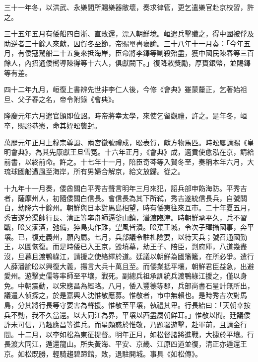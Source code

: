 \begin{pinyinscope}
三十一年冬，以洪武、永樂間所賜樂器敝壞，奏求律管，更乞遣樂官赴京校習，許之。

三十五年五月有倭船四自浙、直敗還，漂入朝鮮境。峘遣兵擊殲之，得中國被俘及助逆者三十餘人來獻，因賀冬至節，帝賜璽書褒諭。三十八年十一月奏：「今年五月，有倭寇駕船二十五隻來抵海岸，臣命將李鐸等剿殺殆盡，獲中國民陳春等三百餘人，內招通倭嚮導陳得等十六人，俱獻闕下。」復降敕獎勵，厚賚銀幣，並賜鐸等有差。

四十二年九月，峘復上書辨先世非李仁人後，今修《會典》雖蒙釐正，乞著始祖旦、父子春之名，帝令附錄《會典》。

隆慶元年六月遣官頒即位詔。時帝將幸太學，來使乞留觀禮，許之。是年冬，峘卒，賜謚恭憲，命其姪昖襲封。

萬歷元年正月上穆宗尊謚、兩宮徽號禮成，昖表賀，獻方物馬匹。時昖屢請賜《皇明會典》，為其先康獻王旦雪冤。十六年正月，《會典》成，適貢使愈泓在京，請給前書，以終前命。許之。十七年十一月，陪臣奇芩等入賀冬至，奏稱本年六月，大琉球國船遭風至海岸，所有男婦合解京，給文放歸。從之。

十九年十一月奏，倭酋關白平秀吉聲言明年三月來犯，詔兵部申飭海防。平秀吉者，薩摩州人，初隨倭關白信長。會信長為其下所弒，秀吉遂統信長兵，自號關白，劫降六十餘州。朝鮮與日本對馬島相望，時有倭夷往來互市。二十年夏五月，秀吉遂分渠帥行長、清正等率舟師逼釜山鎮，潛渡臨津。時朝鮮承平久，兵不習戰，昖又湎酒，弛備，猝島夷作難，望風皆潰。昖棄王城，令次子琿攝國事，奔平壤。已，復走義州，願內屬。七月，兵部議令駐札險要，以待天兵；號召通國勤王，以圖恢復。而是時倭已入王京，毀墳墓，劫王子、陪臣，剽府庫，八道幾盡沒，旦暮且渡鴨綠江，請援之使絡繹於道。廷議以朝鮮為國籓籬，在所必爭。遣行人薛潘諭昖以興復大義，揚言大兵十萬且至。而倭業抵平壤，朝鮮君臣益急，出避愛州。遊擊史儒等率師至平壤，戰死。副總兵祖承訓統兵渡鴨綠江援之，僅以身免。中朝震動，以宋應昌為經略。八月，倭入豐德等郡，兵部尚書石星計無所出，議遣人偵探之，於是嘉興人沈惟敬應募。惟敬者，市中無賴也。是時秀吉次對馬島，分其將行長等守要害為聲援。惟敬至平壤，執禮其卑。行長紿曰：「天朝幸按兵不動，我不久當還。以大同江為界，平壤以西盡屬朝鮮耳。」惟敬以聞。廷議倭詐未可信，乃趣應昌等進兵。而星頗惑於惟敬，乃題署遊擊，赴軍前，且請金行間。十二月，以李如松為東征提督。明年正月，如松督諸將進戰，大捷於平壤。行長渡大同江，遁還龍山。所失黃海、平安、京畿、江原四道並復，清正亦遁還王京。如松既勝，輕騎趨碧蹄館，敗，退駐開城。事具《如松傳》。


\end{pinyinscope}
